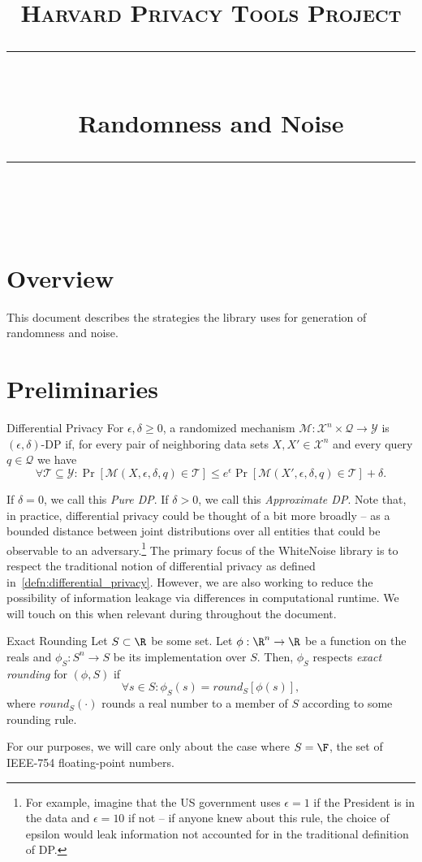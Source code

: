 \documentclass[11pt]{scrartcl} %
\title{
	\normalfont\normalsize
	\textsc{Harvard Privacy Tools Project}\\ %
	\vspace{25pt} %
	\rule{\linewidth}{0.5pt}\\ %
	\vspace{20pt} %
	{\huge Randomness and Noise}\\ %
	\vspace{12pt} %
	\rule{\linewidth}{2pt}\\ %
	\vspace{12pt} %
}
\author{} %
\date{} %
\begin{document}
\maketitle

\tableofcontents

\section{Overview}
This document describes the strategies the library uses for generation of randomness and noise.

\section{Preliminaries}
\begin{definition}
	\label{defn:differential_privacy}
	Differential Privacy \cite{DMNS06} \newline
	For $\epsilon, \delta \geq 0$, a randomized mechanism
	$\mathcal{M}: \mathcal{X}^n \times \mathcal{Q} \rightarrow \mathcal{Y}$ is
	$(\epsilon, \delta)$-DP if, for every pair of neighboring data sets $X, X' \in \mathcal{X}^n$ and
	every query $q \in \mathcal{Q}$ we have
	\[ \forall \mathcal{T} \subseteq \mathcal{Y}: \Pr[\mathcal{M}(X, \epsilon, \delta, q) \in \mathcal{T}] \leq e^{\epsilon} \Pr[\mathcal{M}(X', \epsilon, \delta, q) \in \mathcal{T}] + \delta. \]
\end{definition}
If $\delta = 0$, we call this \emph{Pure DP}. If $\delta > 0$, we call this \emph{Approximate DP}.
Note that, in practice, differential privacy could be thought of a bit more broadly -- as a bounded
distance between joint distributions over all entities that could be observable to an adversary.\footnote{For example, imagine that the 
US government uses $\epsilon = 1$ if the President is in the data and $\epsilon = 10$
if not -- if anyone knew about this rule, the choice of epsilon would leak information not accounted for in the
traditional definition of DP.} The primary focus of the WhiteNoise library is to respect the traditional notion of 
differential privacy as defined in~\ref{defn:differential_privacy}. However, we are also working to
reduce the possibility of information leakage via differences in computational runtime. We will touch on this when relevant 
during throughout the document.

\begin{definition}
	\label{defn:exact_rounding}
	Exact Rounding \newline
	Let $S \subset \R$ be some set.
	Let $\phi: \R^n \rightarrow \R$ be a function on the reals and $\phi_{S}: S^n \rightarrow S$ be its implementation over $S$.
	Then, $\phi_{S}$ respects \emph{exact rounding} for $(\phi, S)$ if
	\[ \forall s \in S: \phi_{S}(s) = round_{S}[\phi(s)], \]
	where $round_{S}(\cdot)$ rounds a real number to a member of $S$ according to some rounding rule.
\end{definition}
For our purposes, we will care only about the case where $S = \F$, the set of IEEE-754 floating-point numbers.
\end{document}

